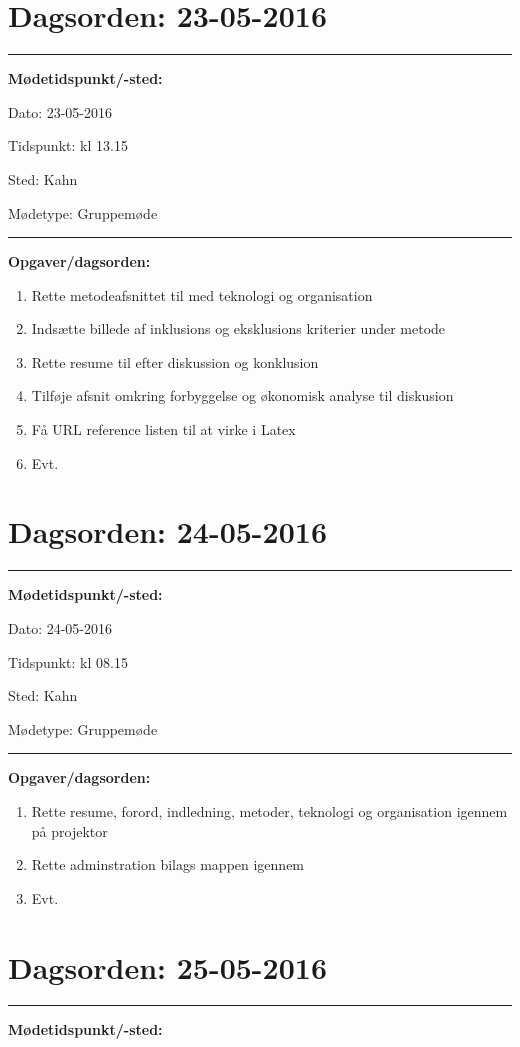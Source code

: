 \section{Dagsorden: 23-05-2016 }
\hrule
\textbf{Mødetidspunkt/-sted:} 

Dato: \tabto{7em} 23-05-2016

Tidspunkt: \tabto{7em} kl 13.15

Sted: \tabto{7em} Kahn 

Mødetype: \tabto{7em} Gruppemøde \newline


\hrule
\textbf{Opgaver/dagsorden:} \newline
\begin{enumerate}
	\item Rette metodeafsnittet til med teknologi og organisation
	\item Indsætte billede af inklusions og eksklusions kriterier under metode
	\item Rette resume til efter diskussion og konklusion
	\item Tilføje afsnit omkring forbyggelse og økonomisk analyse til diskusion
	\item Få URL reference listen til at virke i Latex
	\item Evt. 
\end{enumerate}

\section{Dagsorden: 24-05-2016 }
\hrule
\textbf{Mødetidspunkt/-sted:} 

Dato: \tabto{7em} 24-05-2016

Tidspunkt: \tabto{7em} kl 08.15

Sted: \tabto{7em} Kahn 

Mødetype: \tabto{7em} Gruppemøde \newline


\hrule
\textbf{Opgaver/dagsorden:} \newline
\begin{enumerate}
	\item Rette resume, forord, indledning, metoder, teknologi og organisation igennem på projektor
	\item Rette adminstration bilags mappen igennem
	\item Evt. 
\end{enumerate}

\section{Dagsorden: 25-05-2016 }
\hrule
\textbf{Mødetidspunkt/-sted:} 

